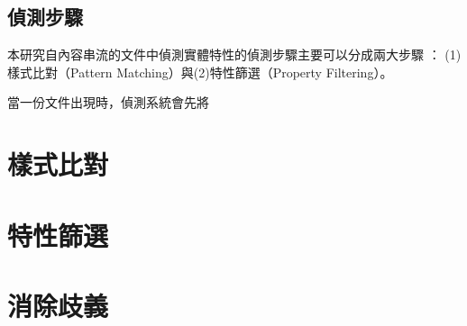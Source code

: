 

\subsection{偵測步驟}

本研究自內容串流的文件中偵測實體特性的偵測步驟主要可以分成兩大步驟 ：
(1)樣式比對（Pattern Matching）與(2)特性篩選（Property Filtering）。

當一份文件出現時，偵測系統會先將

\section{樣式比對}

\section{特性篩選}

\section{}
\section{消除歧義}



